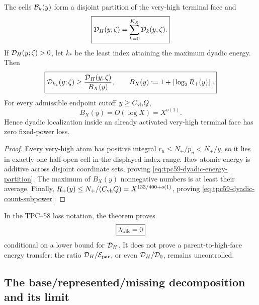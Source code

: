 \begin{theorem}
\label{thm:tpc59-exact-dyadic-localization}
The cells \(\mathcal B_k(y)\) form a disjoint partition of the very-high terminal
face and
\begin{equation}
 \boxed{
 \mathcal D_H(y;\zeta)=\sum_{k=0}^{K_X}\mathcal D_k(y;\zeta).}
 \label{eq:tpc59-dyadic-energy-partition}
\end{equation}
If \(\mathcal D_H(y;\zeta)>0\), let \(k_*\) be the least index attaining the
maximum dyadic energy.  Then
\begin{equation}
 \boxed{
 \mathcal D_{k_*}(y;\zeta)
 \ge\frac{\mathcal D_H(y;\zeta)}{B_X(y)},
 \qquad
 B_X(y):=1+\left\lfloor\log_2R_+(y)\right\rfloor.}
 \label{eq:tpc59-dyadic-pigeonhole}
\end{equation}
For every admissible endpoint cutoff \(y\ge C_{\rm vh}Q\),
\begin{equation}
 B_X(y)=O(\log X)=X^{o(1)}.
 \label{eq:tpc59-dyadic-count-subpower}
\end{equation}
Hence dyadic localization inside an already activated very-high terminal
face has zero fixed-power loss.
\end{theorem}

\begin{proof}
Every very-high atom has positive integral \(r_u\le N_+/p_u<N_+/y\), so it
lies in exactly one half-open cell in the displayed index range.  Raw atomic
energy is additive across disjoint coordinate sets, proving
\eqref{eq:tpc59-dyadic-energy-partition}.  The maximum of \(B_X(y)\)
nonnegative numbers is at least their average.  Finally,
\(R_+(y)\le N_+/(C_{\rm vh}Q)=X^{133/400+o(1)}\), proving
\eqref{eq:tpc59-dyadic-count-subpower}.
\end{proof}

In the TPC--58 loss notation, the theorem proves
\begin{equation}
 \boxed{\lambda_{\rm blk}=0}
 \label{eq:tpc59-zero-block-exponent}
\end{equation}
conditional on a lower bound for \(\mathcal D_H\).  It does not prove
a parent-to-high-face energy transfer: the ratio
\(\mathcal D_H/\mathcal E_{\rm par}\), or even \(\mathcal D_H/\mathcal D_0\), remains uncontrolled.

\subsection{The base/represented/missing decomposition and its limit}

